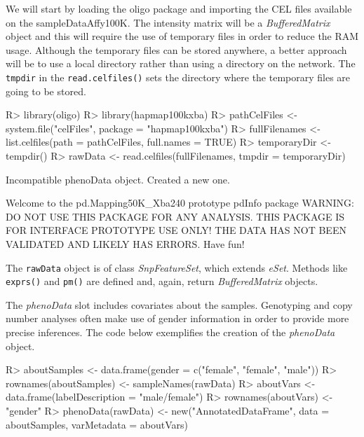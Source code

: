 \documentclass{article}
\newcommand{\Rfunction}[1]{{\texttt{#1}}}
\newcommand{\Rmethod}[1]{{\texttt{#1}}}
\newcommand{\Robject}[1]{{\texttt{#1}}}
\newcommand{\Rpackage}[1]{{\textsf{#1}}}
\newcommand{\Rclass}[1]{{\textit{#1}}}
\newcommand{\oligo}{\Rpackage{oligo }}
\begin{document}
We will start by loading the \oligo package and importing the CEL
files available on the \Rpackage{sampleDataAffy100K}. The intensity
matrix will be a \Rclass{BufferedMatrix} object and this will require
the use of temporary files in order to reduce the RAM usage. Although
the temporary files can be stored anywhere, a better approach will be
to use a local directory rather than using a directory on the
network. The \Robject{tmpdir} in the \Rfunction{read.celfiles()} sets
the directory where the temporary files are going to be stored.

\begin{Schunk}
\begin{Sinput}
R> library(oligo)
R> library(hapmap100kxba)
R> pathCelFiles <- system.file("celFiles", package = "hapmap100kxba")
R> fullFilenames <- list.celfiles(path = pathCelFiles, 
     full.names = TRUE)
R> temporaryDir <- tempdir()
R> rawData <- read.celfiles(fullFilenames, tmpdir = temporaryDir)
\end{Sinput}
\begin{Soutput}
Incompatible phenoData object. Created a new one.


Welcome to the pd.Mapping50K_Xba240 prototype pdInfo package
WARNING: DO NOT USE THIS PACKAGE FOR ANY ANALYSIS.
THIS PACKAGE IS FOR INTERFACE PROTOTYPE USE ONLY!
THE DATA HAS NOT BEEN VALIDATED AND LIKELY HAS ERRORS.
Have fun!
\end{Soutput}
\end{Schunk}

The \Robject{rawData} object is of class \Rclass{SnpFeatureSet}, which
extends \Rclass{eSet}. Methods like \Rmethod{exprs()} and
\Rmethod{pm()} are defined and, again, return \Rclass{BufferedMatrix}
objects.

The \Rclass{phenoData} slot includes covariates about the
samples. Genotyping and copy number analyses often make use of gender
information in order to provide more precise inferences. The code
below exemplifies the creation of the \Rclass{phenoData} object.

\begin{Schunk}
\begin{Sinput}
R> aboutSamples <- data.frame(gender = c("female", 
     "female", "male"))
R> rownames(aboutSamples) <- sampleNames(rawData)
R> aboutVars <- data.frame(labelDescription = "male/female")
R> rownames(aboutVars) <- "gender"
R> phenoData(rawData) <- new("AnnotatedDataFrame", 
     data = aboutSamples, varMetadata = aboutVars)
\end{Sinput}
\end{Schunk}
\end{document}
